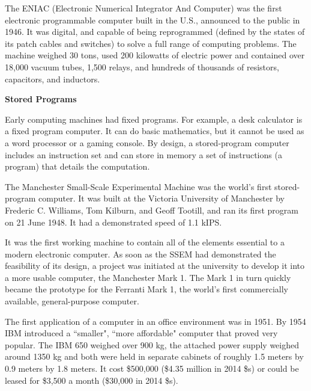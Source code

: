 \documentclass[12pt]{article}
\begin{document}
The ENIAC (Electronic Numerical Integrator And Computer) was the first electronic programmable computer built in the U.S., announced to the public in 1946. It was digital, and capable of being reprogrammed (defined by the states of its patch cables and switches) to solve a full range of computing problems. %
The machine weighed 30 tons, used 200 kilowatts of electric power and contained over 18,000 vacuum tubes, 1,500 relays, and hundreds of thousands of resistors, capacitors, and inductors.

\vspace*{2em}
\noindent \textbf{Stored Programs}

Early computing machines had fixed programs. For example, a desk calculator is a fixed program computer. It can do basic mathematics, but it cannot be used as a word processor or a gaming console. By design, a stored-program computer includes an instruction set and can store in memory a set of instructions (a program) that details the computation.

The Manchester Small-Scale Experimental Machine was the world's first stored-program computer. It was built at the Victoria University of Manchester by Frederic C. Williams, Tom Kilburn, and Geoff Tootill, and ran its first program on 21 June 1948. It had a demonstrated speed of 1.1 kIPS.

It was the first working machine to contain all of the elements essential to a modern electronic computer. As soon as the SSEM had demonstrated the feasibility of its design, a project was initiated at the university to develop it into a more usable computer, the Manchester Mark 1. The Mark 1 in turn quickly became the prototype for the Ferranti Mark 1, the world's first commercially available, general-purpose computer.

The first application of a computer in an office environment was in 1951. By 1954 IBM introduced a ``smaller", ``more affordable" computer that proved very popular. The IBM 650 weighed over 900 kg, the attached power supply weighed around 1350 kg and both were held in separate cabinets of roughly 1.5 meters by 0.9 meters by 1.8 meters. It cost \$500,000 (\$4.35 million in 2014 \$s) or could be leased for \$3,500 a month (\$30,000 in 2014 \$s).
\end{document}
